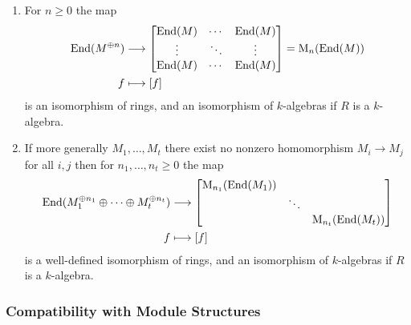 \begin{corollary}
  \label{corollary: decomposition of endomorphisms for orthogonal modules}
  \leavevmode
  \begin{enumerate}
    \item
      For $n \geq 0$ the map
      \begin{align*}
                  \operatorname{End}(M^{\oplus n})
        &\longrightarrow  \begin{bmatrix}
                    \operatorname{End}(M) & \cdots  & \operatorname{End}(M) \\
                    \vdots  & \ddots  & \vdots  \\
                    \operatorname{End}(M) & \cdots  & \operatorname{End}(M)
                  \end{bmatrix}
        =        \operatorname{M}_n( \operatorname{End}(M) )
        \\
                      f
        &\longmapsto  [f]
      \end{align*}
      is an isomorphism of rings, and an isomorphism of $k$-algebras if $R$ is a $k$-algebra.
    \item
      If more generally $M_1, \dotsc, M_t$ there exist no nonzero homomorphism $M_i \to M_j$ for all $i, j$ then for $n_1, \dotsc, n_t \geq 0$ the map
      \begin{align*}
                  \operatorname{End}(M_1^{\oplus n_1} \oplus \dotsb \oplus M_t^{\oplus n_t})
        &\longrightarrow  \begin{bmatrix}
                      \operatorname{M}_{n_1}( \operatorname{End}(M_1) )
                    & {}
                    & {}
                    \\
                      {}
                    & \ddots
                    & {}
                    \\
                      {}
                    & {}
                    & \operatorname{M}_{n_t}( \operatorname{End}(M_t) )
                  \end{bmatrix}
        \\
                      f
        &\longmapsto  [f]
      \end{align*}
      is a well-defined isomorphism of rings, and an isomorphism of $k$-algebras if $R$ is a $k$-algebra.
  \end{enumerate}
\end{corollary}





\subsubsection{Compatibility with Module Structures}


